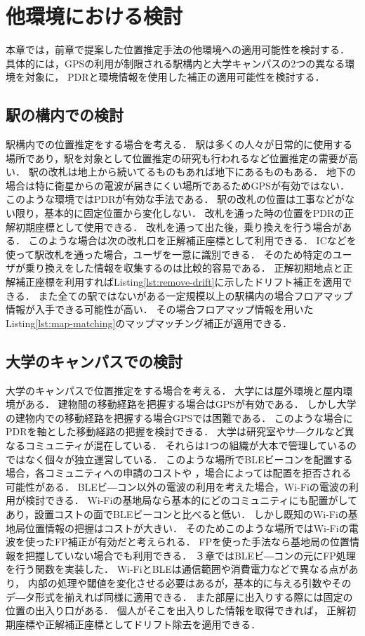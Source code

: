 
\section{他環境における検討}

本章では，前章で提案した位置推定手法の他環境への適用可能性を検討する．
具体的には，GPSの利用が制限される駅構内と大学キャンパスの2つの異なる環境を対象に，
PDRと環境情報を使用した補正の適用可能性を検討する．


\subsection{駅の構内での検討}
駅構内での位置推定をする場合を考える．
駅は多くの人々が日常的に使用する場所であり，駅を対象として位置推定の研究も行われるなど位置推定の需要が高い．
駅の改札は地上から続いてるものもあれば地下にあるものもある．
地下の場合は特に衛星からの電波が届きにくい場所であるためGPSが有効ではない．
このような環境ではPDRが有効な手法である．
駅の改札の位置は工事などがない限り，基本的に固定位置から変化しない．
改札を通った時の位置をPDRの正解初期座標として使用できる．
改札を通って出た後，乗り換えを行う場合がある．
このような場合は次の改札口を正解補正座標として利用できる．
ICなどを使って駅改札を通った場合，ユーザを一意に識別できる．
そのため特定のユーザが乗り換えをした情報を収集するのは比較的容易である．
正解初期地点と正解補正座標を利用すればListing\ref{lst:remove-drift}に示したドリフト補正を適用できる．
また全ての駅ではないがある一定規模以上の駅構内の場合フロアマップ情報が入手できる可能性が高い．
その場合フロアマップ情報を用いたListing\ref{lst:map-matching}のマップマッチング補正が適用できる．

\subsection{大学のキャンパスでの検討}
大学のキャンパスで位置推定をする場合を考える．
大学には屋外環境と屋内環境がある．
建物間の移動経路を把握する場合はGPSが有効である．
しかし大学の建物内での移動経路を把握する場合GPSでは困難である．
このような場合にPDRを軸とした移動経路の把握を検討できる．
大学は研究室やサ―クルなど異なるコミュニティが混在している．
それらは1つの組織が大本で管理しているのではなく個々が独立運営している．
このような場所でBLEビーコンを配置する場合，各コミュニティへの申請のコストや
，場合によっては配置を拒否される可能性がある．
BLEビ―コン以外の電波の利用を考えた場合，Wi-Fiの電波の利用が検討できる．
Wi-Fiの基地局なら基本的にどのコミュニティにも配置がしてあり，設置コストの面でBLEビーコンと比べると低い．
しかし既知のWi-Fiの基地局位置情報の把握はコストが大きい．
そのためこのような場所ではWi-Fiの電波を使ったFP補正が有効だと考えられる．
FPを使った手法なら基地局の位置情報を把握していない場合でも利用できる．
３章ではBLEビ―コンの元にFP処理を行う関数を実装した．
Wi-FiとBLEは通信範囲や消費電力などで異なる点があり，
内部の処理や閾値を変化させる必要はあるが，基本的に与える引数やそのデ―タ形式を揃えれば同様に適用できる．
また部屋に出入りする際には固定の位置の出入り口がある．
個人がそこを出入りした情報を取得できれば，
正解初期座標や正解補正座標としてドリフト除去を適用できる．
